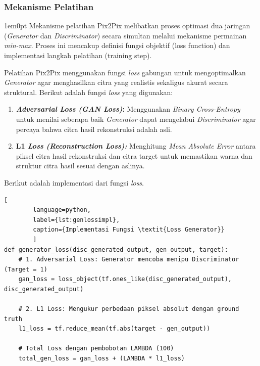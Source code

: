 \subsubsection{Mekanisme Pelatihan}

\begin{adjustwidth}{1em}{0pt}
	\hspace{\parindent}Mekanisme pelatihan Pix2Pix melibatkan proses optimasi dua jaringan (\textit{Generator} dan \textit{Discriminator}) secara simultan melalui mekanisme permainan \textit{min-max}. Proses ini mencakup definisi fungsi objektif (loss function) dan implementasi langkah pelatihan (training step).
	
	Pelatihan Pix2Pix menggunakan fungsi \textit{loss} gabungan untuk mengoptimalkan \textit{Generator} agar menghasilkan citra yang realistis sekaligus akurat secara struktural. Berikut adalah fungsi \textit{loss} yang digunakan:
	
	\begin{enumerate}[nosep]
		
		\item \textbf{\textit{Adversarial Loss (GAN Loss)}:} Menggunakan \textit{Binary Cross-Entropy} untuk menilai seberapa baik \textit{Generator} dapat mengelabui \textit{Discriminator} agar percaya bahwa citra hasil rekonstruksi adalah asli.
		
		\item \textbf{L1 \textit{Loss (Reconstruction Loss):}} Menghitung \textit{Mean Absolute Error} antara piksel citra hasil rekonstruksi dan citra target untuk memastikan warna dan struktur citra hasil sesuai dengan aslinya.
		
	\end{enumerate}
	
	Berikut adalah implementasi dari fungsi \textit{loss}.
	
	\begin{lstlisting}[
		language=python,
		label={lst:genlossimpl},
		caption={Implementasi Fungsi \textit{Loss Generator}}
		]
def generator_loss(disc_generated_output, gen_output, target):
	# 1. Adversarial Loss: Generator mencoba menipu Discriminator (Target = 1)
	gan_loss = loss_object(tf.ones_like(disc_generated_output), disc_generated_output)
	
	# 2. L1 Loss: Mengukur perbedaan piksel absolut dengan ground truth
	l1_loss = tf.reduce_mean(tf.abs(target - gen_output))
	
	# Total Loss dengan pembobotan LAMBDA (100)
	total_gen_loss = gan_loss + (LAMBDA * l1_loss)
	

\end{lstlisting}
\end{adjustwidth}
